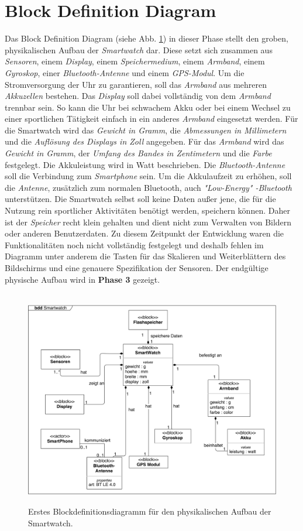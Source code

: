 \section{Block Definition Diagram}
\label{sec:blockdefinitiondiagram}

Das Block Definition Diagram (siehe Abb. \ref{fig:block1}) in dieser Phase stellt den groben, physikalischen Aufbau der \textit{Smartwatch} dar. Diese setzt sich zusammen aus \textit{Sensoren}, einem \textit{Display}, einem \textit{Speichermedium}, einem \textit{Armband}, einem \textit{Gyroskop}, einer \textit{Bluetooth-Antenne} und einem \textit{GPS-Modul}. Um die Stromversorgung der Uhr zu garantieren, soll das \textit{Armband} aus mehreren \textit{Akkuzellen} bestehen. Das \textit{Display} soll dabei vollständig von dem \textit{Armband} trennbar sein. So kann die Uhr bei schwachem Akku oder bei einem Wechsel zu einer sportlichen Tätigkeit einfach in ein anderes \textit{Armband} eingesetzt werden. Für die Smartwatch wird das \textit{Gewicht in Gramm}, die \textit{Abmessungen in Millimetern} und die \textit{Auflösung des Displays in Zoll} angegeben. Für das \textit{Armband} wird das \textit{Gewicht in Gramm}, der \textit{Umfang des Bandes in Zentimetern} und die \textit{Farbe} festgelegt. Die Akkuleistung wird in Watt beschrieben. Die \textit{Bluetooth-Antenne} soll die Verbindung zum \textit{Smartphone} sein. Um die Akkulaufzeit zu erhöhen, soll die \textit{Antenne}, zusätzlich zum normalen Bluetooth, auch \textit{"Low-Energy" -Bluetooth} unterstützen. Die Smartwatch selbst soll keine Daten außer jene, die für die Nutzung rein sportlicher Aktivitäten benötigt werden, speichern können. Daher ist der \textit{Speicher} recht klein gehalten und dient nicht zum Verwalten von Bildern oder anderen Benutzerdaten.
Zu diesem Zeitpunkt der Entwicklung waren die Funktionalitäten noch nicht vollständig festgelegt und deshalb fehlen im Diagramm unter anderem die Tasten für das Skalieren und Weiterblättern des Bildschirms und eine genauere Spezifikation der Sensoren. Der endgültige physische Aufbau wird in \textbf{Phase 3} gezeigt.

\begin{figure}[h]
\centering\
\includegraphics[width=\textwidth]{img/block1}
\caption{Erstes Blockdefinitionsdiagramm für den physikalischen Aufbau der Smartwatch.}\label{fig:block1}
\end{figure}